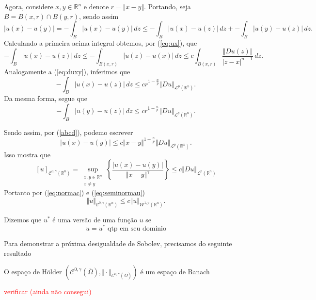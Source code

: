 \documentclass[a4paper, 11pt]{book}
\theoremstyle{definition}
\newcommand{\bR}{\mathbb{R}}
\newcommand{\cC}{\mathcal{C}}
\newcommand{\cL}{\mathcal{L}}
\newcommand{\cW}{\mathcal{W}}
\newcommand{\sint}{-\!\!\!\!\!\!\int}
\begin{document}
\begin{prf}
    Agora, considere $x, y \in \bR^n$ e denote $r = \Vert x - y \Vert$. Portando, seja $B = B(x,r) \cap B(y,r)$, sendo assim
    \begin{equation} \label{eq:abcd}
        |u(x) - u(y)| = \sint_{B} |u(x) - u(y)| \,dz \leqslant \sint_{B} |u(x) - u(z)| \,dz + \sint_B |u(y) - u(z)| \,dz.
    \end{equation}
    Calculando a primeira acima integral obtemos, por (\ref{eq:ux}), que
    \[
        \sint_B |u(x) - u(z)| \,dz \leqslant \sint_{B(x,r)} |u(z) - u(x)| \,dz \leqslant c \int_{B(x,r)} \frac{\Vert Du(z) \Vert}{|z-x|^{n-1}} \,dz.
    \]
    Analogamente a (\ref{eq:duxy}), inferimos que
    \[
        \sint_B |u(x) - u(z)| \,dz \leqslant cr^{1 - \frac{n}{p}} \Vert Du \Vert_{\cL^p(\bR^n)}.
    \]
    Da mesma forma, segue que
    \[
        \sint_B |u(y) - u(z)| \,dz \leqslant cr^{1 - \frac{n}{p}} \Vert Du \Vert_{\cL^p(\bR^n)}.
    \]

    Sendo assim, por (\ref{abcd}), podemo escrever
    \[
        |u(x) - u(y)| \leqslant c \Vert x - y \Vert^{1 - \frac{n}{p}} \Vert Du \Vert_{\cL^p(\bR^n)}.
    \]
    Isso mostra que
    \begin{equation} \label{eq:seminormau}
        [u]_{\cC^{0,\gamma}(\bR^n)} = \sup_{\substack{x,y \in \bR^n\\x \neq y}} \left\{ \frac{|u(x) - u(y)|}{\Vert x - y \Vert^{\gamma}} \right\} \leqslant c \Vert Du \Vert_{\cL^p(\bR^n)}
    \end{equation}
    Portanto por (\ref{eq:normac}) e (\ref{eq:seminormau})
    \[
        \Vert u \Vert_{\cC^{0,\gamma}(\bR^n)} \leqslant c \Vert u \Vert_{\cW^{1,p}(\bR^n)}.
    \]
\end{prf}

\begin{dbox}
    Dizemos que $u^*$ é uma versão de uma função $u$ se
    \[
        u = u^* \text{ qtp em seu domínio}
    \]
\end{dbox}

Para demonstrar a próxima desigualdade de Sobolev, precisamos do seguinte resultado

\begin{tbox}
    O espaço de Hölder $(\cC^{0,\gamma}(\overline\Omega), \Vert \cdot \Vert_{\cC^{0,\gamma}(\overline\Omega)})$ é um espaço de Banach
\end{tbox}
\begin{prf}
    \textcolor{red}{verificar (ainda não consegui)}
\end{prf}
\end{document}
